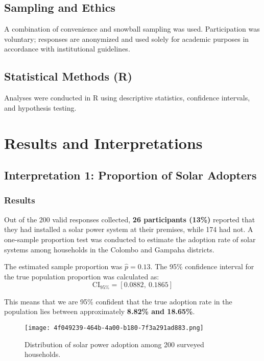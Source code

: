 \documentclass[12pt,a4paper]{article}
\begin{document}
\subsection{Sampling and Ethics}
A combination of convenience and snowball sampling was used. Participation was voluntary; responses are anonymized and used solely for academic purposes in accordance with institutional guidelines.

\subsection{Statistical Methods (R)}
Analyses were conducted in R using descriptive statistics, confidence intervals, and hypothesis testing.

\section{Results and Interpretations}

\subsection{Interpretation 1: Proportion of Solar Adopters}

\subsubsection*{Results}

Out of the 200 valid responses collected, \textbf{26 participants (13\%)} reported that they had installed a solar power system at their premises, while 174 had not. A one-sample proportion test was conducted to estimate the adoption rate of solar systems among households in the Colombo and Gampaha districts.

The estimated sample proportion was $\hat{p} = 0.13$. The 95\% confidence interval for the true population proportion was calculated as:
\[
\text{CI}_{95\%} = [0.0882,\ 0.1865]
\]

This means that we are 95\% confident that the true adoption rate in the population lies between approximately \textbf{8.82\% and 18.65\%}.

\begin{figure}[H]
  \centering
  \texttt{[image: 4f049239-464b-4a00-b180-7f3a291ad883.png]}
  \caption{Distribution of solar power adoption among 200 surveyed households.}
  \label{fig:solar-adoption}
\end{figure}
\end{document}
